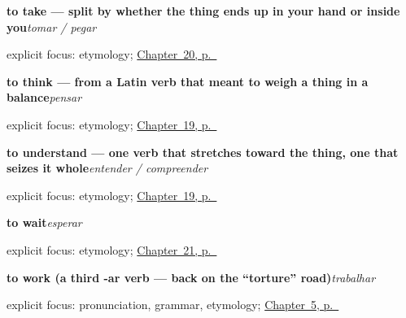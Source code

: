 \noindent\begin{minipage}[t]{\linewidth}
\raggedright
\textbf{to take — split by whether the thing ends up in your hand or inside you}\enspace\emph{tomar / pegar}\par
\footnotesize explicit focus: etymology; \hyperref[ch:pt-taking-asking-helping-liking]{Chapter~20, p.~\pageref*{ch:pt-taking-asking-helping-liking}}
\end{minipage}\par\smallskip

\noindent\begin{minipage}[t]{\linewidth}
\raggedright
\textbf{to think — from a Latin verb that meant to weigh a thing in a balance}\enspace\emph{pensar}\par
\footnotesize explicit focus: etymology; \hyperref[ch:pt-mind-verbs]{Chapter~19, p.~\pageref*{ch:pt-mind-verbs}}
\end{minipage}\par\smallskip

\noindent\begin{minipage}[t]{\linewidth}
\raggedright
\textbf{to understand — one verb that stretches toward the thing, one that seizes it whole}\enspace\emph{entender / compreender}\par
\footnotesize explicit focus: etymology; \hyperref[ch:pt-mind-verbs]{Chapter~19, p.~\pageref*{ch:pt-mind-verbs}}
\end{minipage}\par\smallskip

\noindent\begin{minipage}[t]{\linewidth}
\raggedright
\textbf{to wait}\enspace\emph{esperar}\par
\footnotesize explicit focus: etymology; \hyperref[ch:pt-bringing-getting-waiting-buying]{Chapter~21, p.~\pageref*{ch:pt-bringing-getting-waiting-buying}}
\end{minipage}\par\smallskip

\noindent\begin{minipage}[t]{\linewidth}
\raggedright
\textbf{to work (a third -ar verb — back on the \textquotedblleft{}torture\textquotedblright{} road)}\enspace\emph{trabalhar}\par
\footnotesize explicit focus: pronunciation, grammar, etymology; \hyperref[ch:pt-first-verbs]{Chapter~5, p.~\pageref*{ch:pt-first-verbs}}
\end{minipage}\par\smallskip

